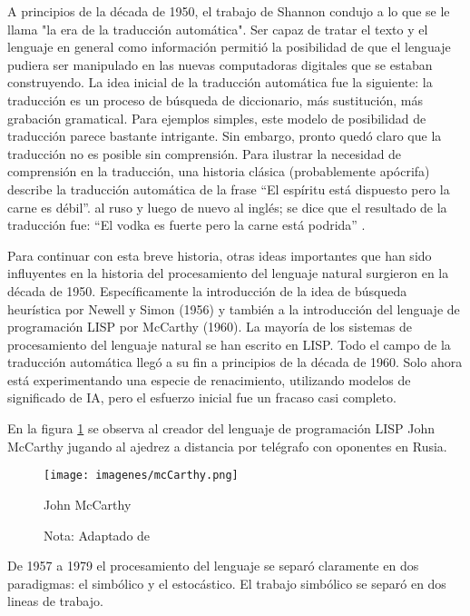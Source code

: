 \documentclass[12pt]{article}
\begin{document}
					
			A principios de la década de 1950, el trabajo de Shannon condujo a lo que se le llama "la era de la traducción automática". Ser capaz de tratar el texto y el lenguaje en general como información permitió la posibilidad de que el lenguaje pudiera ser manipulado en las nuevas computadoras digitales que se estaban construyendo. La idea inicial de la traducción automática fue la siguiente: la traducción es un proceso de búsqueda de diccionario, más sustitución, más grabación gramatical. Para ejemplos simples, este modelo de posibilidad de traducción parece bastante intrigante. Sin embargo, pronto quedó claro que la traducción no es posible sin comprensión. Para ilustrar la necesidad de comprensión en la traducción, una historia clásica (probablemente apócrifa) describe la traducción automática de la frase ``El espíritu está dispuesto pero la carne es débil''. al ruso y luego de nuevo al inglés; se dice que el resultado de la traducción fue: ``El vodka es fuerte pero la carne está podrida'' .\cite{Lehnert2014}
			
			Para continuar con esta breve historia, otras ideas importantes que han sido influyentes en la historia del procesamiento del lenguaje natural surgieron en la década de 1950. Específicamente la introducción de la idea de búsqueda heurística por Newell y Simon (1956) y también a la introducción del lenguaje de programación LISP por McCarthy (1960). La mayoría de los sistemas de procesamiento del lenguaje natural se han escrito en LISP.
			Todo el campo de la traducción automática llegó a su fin a principios de la década de 1960. Solo ahora está experimentando una especie de renacimiento, utilizando modelos de significado de IA, pero el esfuerzo inicial fue un fracaso casi completo.\cite{Lehnert2014}
			
			En la figura \ref{fig:JohnMcCarthy} se observa al creador del lenguaje de programación LISP John McCarthy jugando al ajedrez a distancia por telégrafo con oponentes en Rusia. 
				
			\begin{figure}[H]
				\texttt{[image: imagenes/mcCarthy.png]}
				\centering
				\caption{John McCarthy}
				\caption*{\small Nota: Adaptado de  \cite{Khanna2020}}
				\label{fig:JohnMcCarthy}
			\end{figure}
		
		
			De 1957 a 1979 el procesamiento del lenguaje se separó claramente en dos paradigmas: el simbólico y el estocástico. El trabajo simbólico se separó en dos lineas de trabajo. 
			
\end{document}
